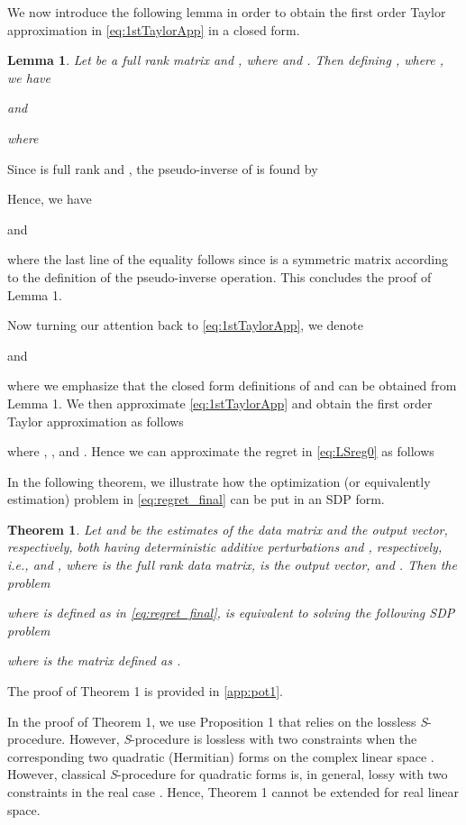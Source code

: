\documentclass[review,sort&compress]{elsarticle}
\newtheorem{thm}{Theorem}
\newtheorem{lem}{Lemma}
\begin{document}
We now introduce the following lemma in order to obtain the first order Taylor approximation in \eqref{eq:1stTaylorApp} in a closed form.

\begin{lem}\label{lem1}
Let  be a full rank matrix and , where  and . Then defining , where , we have

and

where 
\end{lem}

\begin{pol1}
Since  is full rank and , the pseudo-inverse of  is found by \cite{graham}

Hence, we have \cite{graham}

and

where the last line of the equality follows since  is a symmetric matrix according to the definition of the pseudo-inverse operation. This concludes the proof of Lemma 1. \hfill 
\end{pol1}

Now turning our attention back to \eqref{eq:1stTaylorApp}, we denote

and

where we emphasize that the closed form definitions of  and  can be obtained from Lemma 1. We then approximate \eqref{eq:1stTaylorApp} and obtain the first order Taylor approximation as follows

where , , and . Hence we can approximate the regret in \eqref{eq:LSreg0} as follows


In the following theorem, we illustrate how the optimization (or equivalently estimation) problem in \eqref{eq:regret_final} can be put in an SDP form.

\begin{thm}\label{thm1}
Let  and  be the estimates of the data matrix and the output vector, respectively, both having deterministic additive perturbations  and , respectively, i.e.,  and , where  is the full rank data matrix,  is the output vector, and . Then the problem

where  is defined as in \eqref{eq:regret_final}, is equivalent to solving the following SDP problem

where  is the  matrix defined as .
\end{thm}

The proof of Theorem 1 is provided in \ref{app:pot1}.

\begin{rmk}
In the proof of Theorem 1, we use Proposition 1 that relies on the lossless {\em S}-procedure. However, {\em S}-procedure is lossless with two constraints when the corresponding two quadratic (Hermitian) forms on the complex linear space \cite{s1}. However, classical {\em S}-procedure for quadratic forms is, in general, lossy with two constraints in the real case \cite{s2}. Hence, Theorem 1 cannot be extended for real linear space.
\end{rmk}
\end{document}
